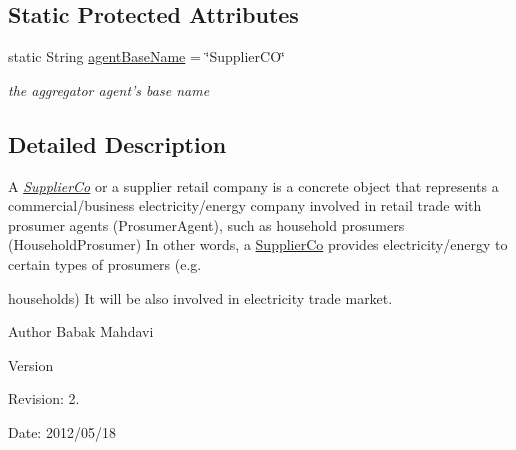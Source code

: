 \subsection*{Static Protected Attributes}
\begin{DoxyCompactItemize}
\item 
\hypertarget{classuk_1_1ac_1_1dmu_1_1iesd_1_1cascade_1_1agents_1_1aggregators_1_1_supplier_co_a7ded7d62039edf89487b1c184be6bfbd}{static String \hyperlink{classuk_1_1ac_1_1dmu_1_1iesd_1_1cascade_1_1agents_1_1aggregators_1_1_supplier_co_a7ded7d62039edf89487b1c184be6bfbd}{agent\-Base\-Name} = \char`\"{}Supplier\-C\-O\char`\"{}}\label{classuk_1_1ac_1_1dmu_1_1iesd_1_1cascade_1_1agents_1_1aggregators_1_1_supplier_co_a7ded7d62039edf89487b1c184be6bfbd}

\begin{DoxyCompactList}\small\item\em the aggregator agent's base name \end{DoxyCompactList}\end{DoxyCompactItemize}


\subsection{Detailed Description}
A {\itshape \hyperlink{classuk_1_1ac_1_1dmu_1_1iesd_1_1cascade_1_1agents_1_1aggregators_1_1_supplier_co}{Supplier\-Co}} or a supplier retail company is a concrete object that represents a commercial/business electricity/energy company involved in retail trade with prosumer agents ({\ttfamily Prosumer\-Agent}), such as household prosumers ({\ttfamily Household\-Prosumer}) In other words, a {\ttfamily \hyperlink{classuk_1_1ac_1_1dmu_1_1iesd_1_1cascade_1_1agents_1_1aggregators_1_1_supplier_co}{Supplier\-Co}} provides electricity/energy to certain types of prosumers (e.\-g. 

households) It will be also involved in electricity trade market.

\begin{DoxyAuthor}{Author}
Babak Mahdavi 
\end{DoxyAuthor}
\begin{DoxyVersion}{Version}

\end{DoxyVersion}
\begin{DoxyParagraph}{Revision\-:}
2. 
\end{DoxyParagraph}
\begin{DoxyParagraph}{Date\-:}
2012/05/18 
\end{DoxyParagraph}


